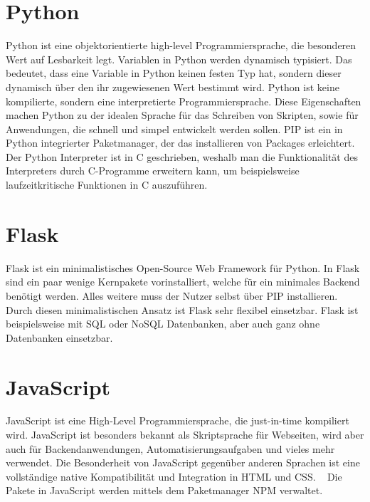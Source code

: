 \section{Python}
\label{sec:python}

Python ist eine objektorientierte high-level Programmiersprache, die besonderen Wert auf Lesbarkeit legt.
Variablen in Python werden dynamisch typisiert.
Das bedeutet, dass eine Variable in Python keinen festen Typ hat, sondern dieser dynamisch über den ihr zugewiesenen Wert bestimmt wird.
Python ist keine kompilierte, sondern eine interpretierte Programmiersprache.
Diese Eigenschaften machen Python zu der idealen Sprache für das Schreiben von Skripten, sowie für Anwendungen, die schnell und simpel entwickelt werden sollen.
PIP ist ein in Python integrierter Paketmanager, der das installieren von Packages erleichtert.
Der Python Interpreter ist in C geschrieben, weshalb man die Funktionalität des Interpreters durch C-Programme erweitern kann, um beispielsweise laufzeitkritische Funktionen in C auszuführen.
~\autocite{van:python}

\section{Flask}
\label{sec:flask}

Flask ist ein minimalistisches Open-Source Web Framework für Python.
In Flask sind ein paar wenige Kernpakete vorinstalliert, welche für ein minimales Backend benötigt werden.
Alles weitere muss der Nutzer selbst über PIP installieren.
~\autocite{grindberg:flask}
Durch diesen minimalistischen Ansatz ist Flask sehr flexibel einsetzbar.
Flask ist beispielsweise mit SQL oder NoSQL Datenbanken, aber auch ganz ohne Datenbanken einsetzbar.


\section{JavaScript}
\label{sec:js}

JavaScript ist eine High-Level Programmiersprache, die just-in-time kompiliert wird.
JavaScript ist besonders bekannt als Skriptsprache für Webseiten, wird aber auch für Backendanwendungen, Automatisierungsaufgaben und vieles mehr verwendet.
Die Besonderheit von JavaScript gegenüber anderen Sprachen ist eine vollständige native Kompatibilität und Integration in HTML und CSS.
~\autocite{javascript:javascript}
Die Pakete in JavaScript werden mittels dem Paketmanager NPM verwaltet.

